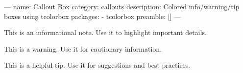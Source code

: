 ---
name: Callout Box
category: callouts
description: Colored info/warning/tip boxes using tcolorbox
packages:
  - tcolorbox
preamble: []
---
\begin{tcolorbox}[colback=blue!5, colframe=blue!75!black, title=Note]
  This is an informational note. Use it to highlight important details.
\end{tcolorbox}

\begin{tcolorbox}[colback=red!5, colframe=red!75!black, title=Warning]
  This is a warning. Use it for cautionary information.
\end{tcolorbox}

\begin{tcolorbox}[colback=green!5, colframe=green!75!black, title=Tip]
  This is a helpful tip. Use it for suggestions and best practices.
\end{tcolorbox}

